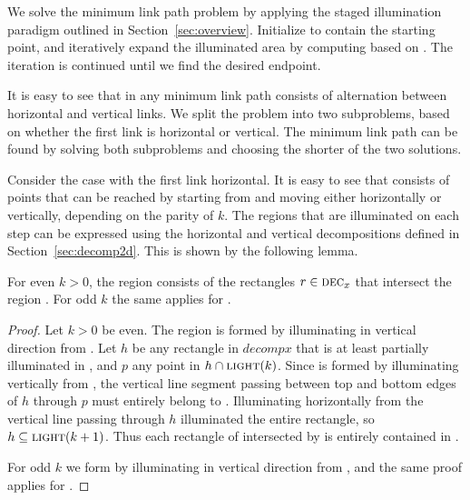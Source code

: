 \documentclass[english,gradu]{tktltiki2018}
\begin{document}
We solve the minimum link path problem by applying the staged illumination paradigm outlined in Section~\ref{sec:overview}.
Initialize  to contain the starting point, and iteratively expand the illuminated area by computing  based on .
The iteration is continued until we find the desired endpoint.

It is easy to see that in any minimum link path consists of alternation between horizontal and vertical links.
We split the problem into two subproblems, based on whether the first link is horizontal or vertical.
The minimum link path can be found by solving both subproblems and choosing the shorter of the two solutions.

Consider the case with the first link horizontal.
It is easy to see that  consists of points that can be reached by starting from  and moving either horizontally or vertically, depending on the parity of $k$.
The regions that are illuminated on each step can be expressed using the horizontal and vertical decompositions defined in Section~\ref{sec:decomp2d}.
This is shown by the following lemma.

\begin{lem}\label{lem:illum2d}
For even $k>0$, the region  consists of the rectangles $r\in\textsc{dec}_{x}$ that intersect the region .
For odd $k$ the same applies for .
\end{lem}
\begin{proof}
Let $k>0$ be even.
The region  is formed by illuminating in vertical direction from .
Let $h$ be any rectangle in $decomp{x}$ that is at least partially illuminated in , and $p$ any point in $h\cap\textsc{light}(k)$.
Since  is formed by illuminating vertically from , the vertical line segment passing between top and bottom edges of $h$ through $p$ must entirely belong to .
Illuminating horizontally from the vertical line passing through $h$ illuminated the entire rectangle, so $h\subseteq\textsc{light}(k+1)$.
Thus each rectangle of  intersected by  is entirely contained in .

For odd $k$ we form  by illuminating in vertical direction from , and the same proof applies for .
\end{proof}
\end{document}

